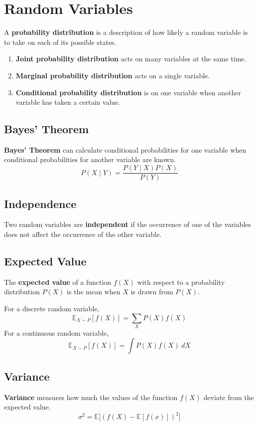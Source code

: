 \documentclass{article}
\begin{document}
\section*{Random Variables}
A \textbf{probability distribution} is a description of how likely a random variable is to take on each of its possible states. 
\begin{enumerate}
    \item \textbf{Joint probability distribution} acts on many variables at the same time.
    \item \textbf{Marginal probability distribution} acts on a single variable.
    \item \textbf{Conditional probability distribution} is on one variable when another variable has taken a certain value.
\end{enumerate}

\subsection*{Bayes' Theorem}
\textbf{Bayes' Theorem} can calculate conditional probabilities for one variable when conditional probabilities for another variable are known.
\[P(X\mid Y)=\frac{P(Y\mid X)P(X)}{P(Y)}\]

\subsection*{Independence}
Two random variables are \textbf{independent} if the occurrence of one of the variables does not affect the occurrence of the other variable.

\subsection*{Expected Value}
The \textbf{expected value} of a function $f(X)$ with respect to a probability distribution $P(X)$ is the mean when $X$ is drawn from $P(X)$.
\vspace{1em}

For a discrete random variable,
\[\mathbb{E}_{X\sim P}[f(X)]=\sum_X P(X)f(X)\]
For a continuous random variable,
\[\mathbb{E}_{X\sim P}[f(X)]=\int P(X)f(X)\: dX\]

\subsection*{Variance}
\textbf{Variance} measures how much the values of the function $f(X)$ deviate from the expected value.
\[\sigma^2 = \mathbb{E}\Big[{(f(X)-\mathbb{E}[f(x)])}^2\Big]\]
\end{document}
